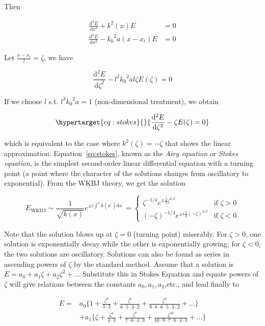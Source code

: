 \documentclass[
  notoc %
]{tufte-book}
\begin{document}
Then

\[
\begin{aligned}
\frac{\mathrm{d}^2 E}{\mathrm{d}x^2} + k^2(x)E &= 0 \\
\frac{\mathrm{d}^2 E}{\mathrm{d}x^2} - {k_0}^2 a (x-x_t) E &= 0
\end{aligned}
\]

Let \(\frac{x-x_t}{l}=\zeta\), we have

\[
\frac{\mathrm{d}^2 E}{\mathrm{d}\zeta^2} - l^2 {k_0}^2 a l \zeta E(\zeta) = 0
\]

If we choose \(l\) s.t. \(l^3 {k_0}^2 a =1\) (non-dimensional
treatment), we obtain

\begin{equation}\protect\hypertarget{eq:stokes}{}{
\frac{\mathrm{d}^2 E}{\mathrm{d}\zeta^2} - \zeta E(\zeta) = 0
}\label{eq:stokes}\end{equation}

which is equivalent to the case where \(k^2(\zeta)=-\zeta\) that shows
the linear approximation. Equation~\ref{eq:stokes}, known as the
\emph{Airy equation} or \emph{Stokes equation}, is the simplest
second-order linear differential equation with a turning point (a point
where the character of the solutions changes from oscillatory to
exponential). From the WKBJ theory, we get the solution

\[
E_{\text{WKBJ}} \sim \frac{1}{\sqrt{k(x)}}e^{\pm i\int^x k(x^\prime)\mathrm{d}x^\prime}
= \left\{
\begin{array}{rl}
\zeta^{-1/4}e^{\mp\frac{2}{3}\zeta^{3/2}} & \text{if } \zeta > 0 \\
(-\zeta)^{-1/4}e^{\pm i \frac{2}{3}(-\zeta)^{3/2}} & \text{if } \zeta < 0
\end{array} \right.
\]

Note that the solution blows up at \(\zeta=0\) (turning point)
miserably. For \(\zeta>0\), one solution is exponentially decay while
the other is exponentially growing; for \(\zeta<0\), the two solutions
are oscillatory. Solutions can also be found as series in ascending
powers of \(\zeta\) by the standard method. Assume that a solution is
\(E=a_0+a_1\zeta+a_2\zeta^2+...\) Substitute this in Stokes Equation and
equate powers of \(\zeta\) will give relations between the constants
\(a_0,a_1,a_2\),etc., and lead finally to

\[
\begin{aligned}
E = &a_0\Big\{ 1+\frac{\zeta^3}{3\cdot2} +\frac{\zeta^6}{6\cdot5\cdot3\cdot2} + \frac{\zeta^9}{9\cdot8\cdot6\cdot5\cdot3\cdot2} + ... \Big\} \\
&+a_1\Big\{ \zeta+\frac{\zeta^4}{4\cdot3} +\frac{\zeta^7}{7\cdot6\cdot4\cdot3} + \frac{\zeta^{10}}{10\cdot9\cdot7\cdot6\cdot4\cdot3} + ...  \Big\}
\end{aligned}
\]
\end{document}
